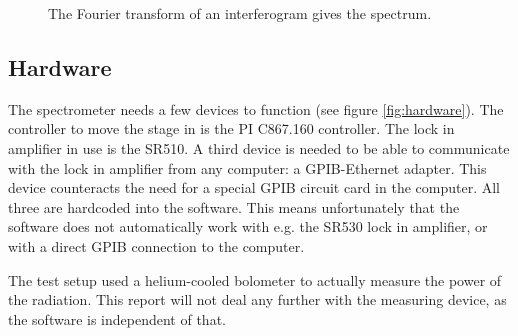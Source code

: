 \begin{figure}
 \begin{center}
  \quad
  \caption{The Fourier transform of an interferogram gives the spectrum.}
  \label{fig:fouriertransform}
 \end{center}
\end{figure}

\subsection{Hardware}

The spectrometer needs a few devices to function (see figure \ref{fig:hardware}). The controller to move the stage in is the PI C867.160 controller. The lock in amplifier in use is the SR510. A third device is needed to be able to communicate with the lock in amplifier from any computer: a GPIB-Ethernet adapter. This device counteracts the need for a special GPIB circuit card in the computer. All three are hardcoded into the software. This means unfortunately that the software does not automatically work with e.g. the SR530 lock in amplifier, or with a direct GPIB connection to the computer.

The test setup used a helium-cooled bolometer to actually measure the power of the radiation. This report will not deal any further with the measuring device, as the software is independent of that.


